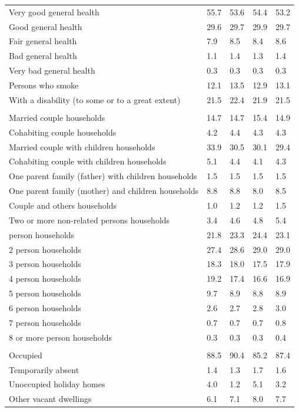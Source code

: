 \documentclass{article}
\begin{document}
\begin{table}[h]
\begin{tabular}{KTTTT}
    \hline
Very good general health & 55.7& 53.6&54.4& 53.2\\
Good general health & 29.6& 29.7& 29.9& 29.7\\
Fair general health & 7.9& 8.5&8.4& 8.6\\
Bad general health & 1.1& 1.4&1.3& 1.4\\
Very bad general health & 0.3& 0.3&0.3& 0.3\\
    \hline
Persons who smoke & 12.1& 13.5&12.9& 13.1\\
    \hline
With a disability (to some or to a great extent) & 21.5& 22.4&21.9& 21.5\\
\hline
    \\ 
    \hline
Married couple households & 14.7& 14.7& 15.4& 14.9\\
Cohabiting couple households & 4.2& 4.4& 4.3& 4.3\\
Married couple with children households & 33.9& 30.5& 30.1& 29.4\\
Cohabiting couple with children households & 5.1& 4.4& 4.1& 4.3\\
One parent family (father) with  children households & 1.5& 1.5& 1.5& 1.5\\
One parent family (mother) and children households & 8.8& 8.8& 8.0& 8.5\\
Couple and others households  & 1.0& 1.2& 1.2& 1.5\\
Two or more non-related persons households & 3.4& 4.6& 4.8& 5.4\\
     person households & 21.8& 23.3& 24.4& 23.1\\
2 person households & 27.4& 28.6& 29.0& 29.0\\
3 person households & 18.3& 18.0& 17.5& 17.9\\
4 person households & 19.2& 17.4& 16.6& 16.9\\
5 person households & 9.7& 8.9& 8.8& 8.9\\
6 person households & 2.6& 2.7& 2.8& 3.0\\
7 person households & 0.7& 0.7& 0.7& 0.8\\
8 or more person households & 0.3& 0.3& 0.3& 0.4\\
\hline
    \\ 
    \hline
Occupied & 88.5& 90.4& 85.2& 87.4\\
Temporarily absent & 1.4& 1.3& 1.7& 1.6\\
Unoccupied holiday homes & 4.0& 1.2& 5.1& 3.2\\
Other vacant dwellings & 6.1& 7.1& 8.0& 7.7\\
\hline
\end{tabular}
\end{table}
\end{document}
